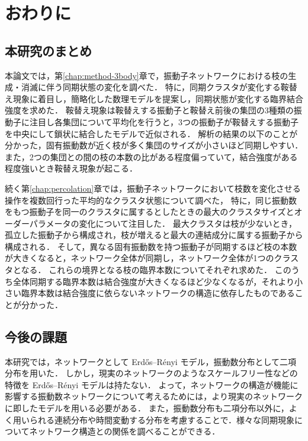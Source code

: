 \documentclass[../main]{subfiles}
\begin{document}
\chapter{おわりに}
\label{chap:summary}
\section{本研究のまとめ}
本論文では，第\ref{chap:method-3body}章で，振動子ネットワークにおける枝の生成・消滅に伴う同期状態の変化を調べた．
特に，同期クラスタが変化する鞍替え現象に着目し，簡略化した数理モデルを提案し，同期状態が変化する臨界結合強度を求めた．
鞍替え現象は鞍替えする振動子と鞍替え前後の集団の3種類の振動子に注目し各集団について平均化を行うと，3つの振動子が鞍替えする振動子を中央にして鎖状に結合したモデルで近似される．
解析の結果の以下のことが分かった，固有振動数が近く枝が多く集団のサイズが小さいほど同期しやすい．
また，2つの集団との間の枝の本数の比がある程度偏っていて，結合強度がある程度強いとき鞍替え現象が起こる．

続く第\ref{chap:percolation}章では，振動子ネットワークにおいて枝数を変化させる操作を複数回行った平均的なクラスタ状態について調べた，
特に，同じ振動数をもつ振動子を同一のクラスタに属するとしたときの最大のクラスタサイズとオーダーパラメータの変化について注目した．
最大クラスタは枝が少ないとき，孤立した振動子から構成され，枝が増えると最大の連結成分に属する振動子から構成される．
そして，異なる固有振動数を持つ振動子が同期するほど枝の本数が大きくなると，ネットワーク全体が同期し，ネットワーク全体が1つのクラスタとなる．
これらの境界となる枝の臨界本数についてそれぞれ求めた．
このうち全体同期する臨界本数は結合強度が大きくなるほど少なくなるが，それより小さい臨界本数は結合強度に依らないネットワークの構造に依存したものであることが分かった．
\section{今後の課題}
本研究では，ネットワークとして Erdős–Rényi モデル，振動数分布として二項分布を用いた．
しかし，現実のネットワークのようなスケールフリー性などの特徴を Erdős–Rényi モデルは持たない．
よって，ネットワークの構造が機能に影響する振動数ネットワークについて考えるためには，より現実のネットワークに即したモデル\cite{Moreno_2004}を用いる必要がある．
また，振動数分布も二項分布以外に，よく用いられる連続分布\cite{RevModPhys.77.137}や時間変動する分布\cite{CUMIN2007181}を考慮することで．様々な同期現象についてネットワーク構造との関係を調べることができる．
\end{document}
